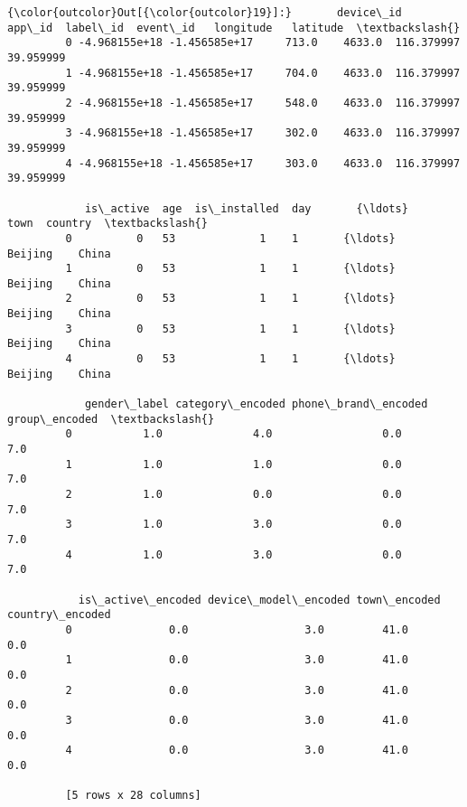 \documentclass[11pt]{article}
\begin{document}
\begin{Verbatim}[commandchars=\\\{\}]
{\color{outcolor}Out[{\color{outcolor}19}]:}       device\_id        app\_id  label\_id  event\_id   longitude   latitude  \textbackslash{}
         0 -4.968155e+18 -1.456585e+17     713.0    4633.0  116.379997  39.959999   
         1 -4.968155e+18 -1.456585e+17     704.0    4633.0  116.379997  39.959999   
         2 -4.968155e+18 -1.456585e+17     548.0    4633.0  116.379997  39.959999   
         3 -4.968155e+18 -1.456585e+17     302.0    4633.0  116.379997  39.959999   
         4 -4.968155e+18 -1.456585e+17     303.0    4633.0  116.379997  39.959999   
         
            is\_active  age  is\_installed  day       {\ldots}           town  country  \textbackslash{}
         0          0   53             1    1       {\ldots}        Beijing    China   
         1          0   53             1    1       {\ldots}        Beijing    China   
         2          0   53             1    1       {\ldots}        Beijing    China   
         3          0   53             1    1       {\ldots}        Beijing    China   
         4          0   53             1    1       {\ldots}        Beijing    China   
         
            gender\_label category\_encoded phone\_brand\_encoded group\_encoded  \textbackslash{}
         0           1.0              4.0                 0.0           7.0   
         1           1.0              1.0                 0.0           7.0   
         2           1.0              0.0                 0.0           7.0   
         3           1.0              3.0                 0.0           7.0   
         4           1.0              3.0                 0.0           7.0   
         
           is\_active\_encoded device\_model\_encoded town\_encoded country\_encoded  
         0               0.0                  3.0         41.0             0.0  
         1               0.0                  3.0         41.0             0.0  
         2               0.0                  3.0         41.0             0.0  
         3               0.0                  3.0         41.0             0.0  
         4               0.0                  3.0         41.0             0.0  
         
         [5 rows x 28 columns]
\end{Verbatim}
            
\end{document}
